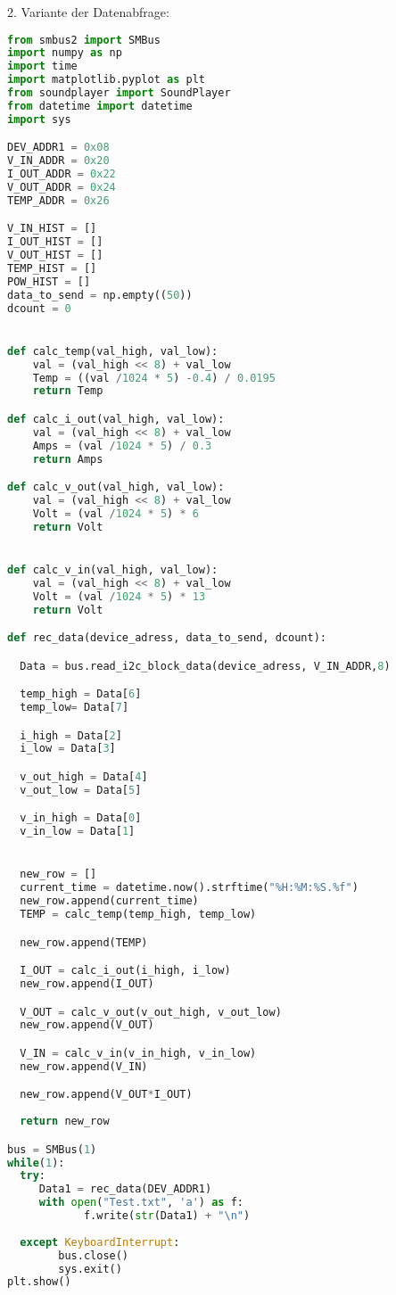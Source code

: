 2. Variante der Datenabfrage: \\
\begin{lstlisting}[language = Python]
from smbus2 import SMBus
import numpy as np
import time
import matplotlib.pyplot as plt
from soundplayer import SoundPlayer
from datetime import datetime
import sys

DEV_ADDR1 = 0x08
V_IN_ADDR = 0x20
I_OUT_ADDR = 0x22
V_OUT_ADDR = 0x24
TEMP_ADDR = 0x26

V_IN_HIST = []
I_OUT_HIST = []
V_OUT_HIST = []
TEMP_HIST = []
POW_HIST = []
data_to_send = np.empty((50))
dcount = 0


def calc_temp(val_high, val_low):
    val = (val_high << 8) + val_low
    Temp = ((val /1024 * 5) -0.4) / 0.0195
    return Temp

def calc_i_out(val_high, val_low):
    val = (val_high << 8) + val_low
    Amps = (val /1024 * 5) / 0.3
    return Amps

def calc_v_out(val_high, val_low):
    val = (val_high << 8) + val_low
    Volt = (val /1024 * 5) * 6
    return Volt


def calc_v_in(val_high, val_low):
    val = (val_high << 8) + val_low
    Volt = (val /1024 * 5) * 13
    return Volt

def rec_data(device_adress, data_to_send, dcount):

  Data = bus.read_i2c_block_data(device_adress, V_IN_ADDR,8)

  temp_high = Data[6]
  temp_low= Data[7]

  i_high = Data[2]
  i_low = Data[3]

  v_out_high = Data[4]
  v_out_low = Data[5]

  v_in_high = Data[0]
  v_in_low = Data[1]


  new_row = []
  current_time = datetime.now().strftime("%H:%M:%S.%f")
  new_row.append(current_time)
  TEMP = calc_temp(temp_high, temp_low)

  new_row.append(TEMP)

  I_OUT = calc_i_out(i_high, i_low)
  new_row.append(I_OUT)

  V_OUT = calc_v_out(v_out_high, v_out_low)
  new_row.append(V_OUT)

  V_IN = calc_v_in(v_in_high, v_in_low)
  new_row.append(V_IN)

  new_row.append(V_OUT*I_OUT)
 
  return new_row

bus = SMBus(1)
while(1):
  try:
     Data1 = rec_data(DEV_ADDR1)
     with open("Test.txt", 'a') as f:
            f.write(str(Data1) + "\n")
   
  except KeyboardInterrupt:
        bus.close()
        sys.exit()
plt.show()

\end{lstlisting}

